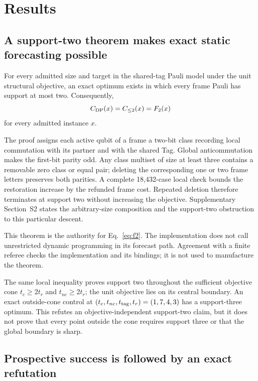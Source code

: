 \section{Results}

\subsection{A support-two theorem makes exact static forecasting possible}

\begin{theorem}
For every admitted size and target in the shared-tag Pauli model under the unit structural objective, an exact optimum exists in which every frame Pauli has support at most two.  Consequently,
\begin{equation}
 C_{\rm DP}(x)=C_{\le2}(x)=F_2(x)
 \label{eq:support2}
\end{equation}
for every admitted instance $x$.
\end{theorem}

The proof assigns each active qubit of a frame a two-bit class recording local commutation with its partner and with the shared Tag.  Global anticommutation makes the first-bit parity odd.  Any class multiset of size at least three contains a removable zero class or equal pair; deleting the corresponding one or two frame letters preserves both parities.  A complete 18,432-case local check bounds the restoration increase by the refunded frame cost.  Repeated deletion therefore terminates at support two without increasing the objective.  Supplementary Section~S2 states the arbitrary-size composition and the support-two obstruction to this particular descent.

This theorem is the authority for Eq.~\eqref{eq:f2}.  The implementation does not call unrestricted dynamic programming in its forecast path.  Agreement with a finite referee checks the implementation and its bindings; it is not used to manufacture the theorem.

The same local inequality proves support two throughout the sufficient objective cone $t_c\ge2t_r$ and $t_{nc}\ge2t_r$; the unit objective lies on its central boundary.  An exact outside-cone control at $(t_c,t_{nc},t_{\rm tag},t_r)=(1,7,4,3)$ has a support-three optimum.  This refutes an objective-independent support-two claim, but it does not prove that every point outside the cone requires support three or that the global boundary is sharp.

\subsection{Prospective success is followed by an exact refutation}

